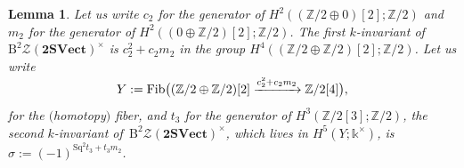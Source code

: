 \documentclass[10pt,a4paper]{amsart}
\newtheorem{Lemma}[Theorem]{Lemma}
\numberwithin{equation}{section}
\begin{document}
\begin{Lemma}\label{lem:kinvariantsZ2SVect}
Let us write $c_2$ for the generator of $H^2((\mathbb{Z}/2\oplus 0)[2];\mathbb{Z}/2)$ and $m_2$ for the generator of $H^2((0\oplus \mathbb{Z}/2)[2];\mathbb{Z}/2)$. The first $k$-invariant of $\mathrm{B}^2\mathscr{Z}(\mathbf{2SVect})^{\times}$ is $c_2^2+c_2m_2$ in the group $H^4((\mathbb{Z}/2\oplus\mathbb{Z}/2)[2];\mathbb{Z}/2)$. Let us write \begin{gather*}
\smash{Y:=\mathrm{Fib}\big((\mathbb{Z}/2\oplus\mathbb{Z}/2)[2]\xrightarrow{c_2^2+c_2m_2}\mathbb{Z}/2[4]\big)},
\end{gather*}
 for the $($homotopy$)$ fiber, and $t_3$ for the generator of $H^3(\mathbb{Z}/2[3];\mathbb{Z}/2)$, the second $k$-invariant of~$\mathrm{B}^2\mathscr{Z}(\mathbf{2SVect})^{\times}$, which lives in $H^5(Y;\mathds{k}^{\times})$, is
$\sigma:=(-1)^{\mathrm{Sq}^2t_3 + t_3m_2}$.
\end{Lemma}
\end{document}
